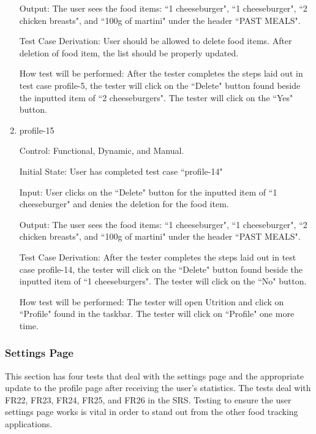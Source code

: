 \documentclass[12pt, titlepage]{article}
\begin{document}
\begin{enumerate}
		Output: The user sees the food items: ``1 cheeseburger", ``1 cheeseburger", ``2 chicken breasts", and ``100g of martini" under the header ``PAST MEALS".
		
		Test Case Derivation: User should be allowed to delete food items. After deletion of food item, the list should be properly updated.
		
		How test will be performed: After the tester completes the steps laid out in test case profile-5, the tester will click on the ``Delete" button found beside the inputted item of ``2 cheeseburgers". The tester will click on the ``Yes" button.
		
		\item{profile-15\\}
		
		Control: Functional, Dynamic, and Manual.
		
		Initial State: User has completed test case ``profile-14"
		
		Input: User clicks on the ``Delete" button for the inputted item of ``1 cheeseburger" and denies the deletion for the food item.
		
		Output: The user sees the food items: ``1 cheeseburger", ``1 cheeseburger", ``2 chicken breasts", and ``100g of martini" under the header ``PAST MEALS".
		
		Test Case Derivation: After the tester completes the steps laid out in test case profile-14, the tester will click on the ``Delete" button found beside the inputted item of ``1 cheeseburgers". The tester will click on the ``No" button.
		
		How test will be performed: The tester will open Utrition and click on ``Profile" found in the taskbar. The tester will click on ``Profile" one more time.
		
	\end{enumerate}
	
	\subsubsection{Settings Page}
	This section has four tests that deal with the settings page and the appropriate update to the profile page after receiving the user's statistics.  The tests deal with FR22, FR23, FR24, FR25, and FR26 in the SRS. Testing to ensure the user settings page works is vital in order to stand out from the other food tracking applications.
	
\end{document}
